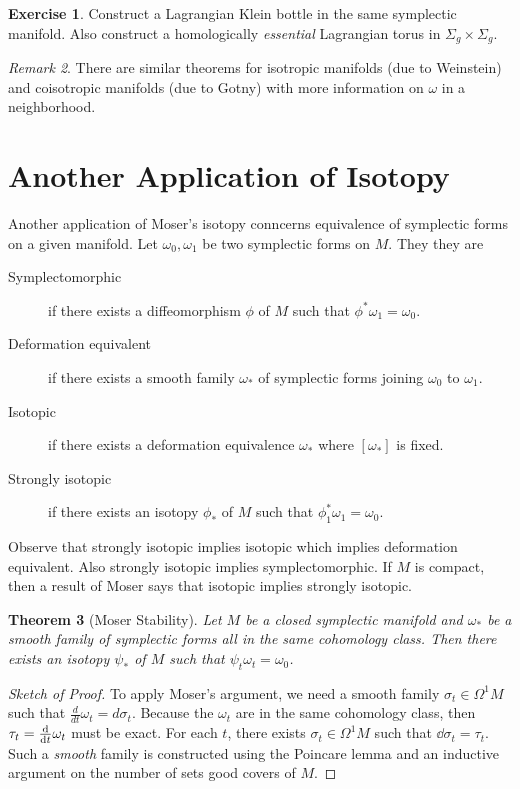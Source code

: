 \documentclass[leqno, openany]{memoir}
\newtheorem{thm}{Theorem}[chapter]
\theoremstyle{definition}
\newtheorem{exer}[thm]{Exercise}
\theoremstyle{remark}
\newtheorem{rmk}[thm]{Remark}
\theoremstyle{plain}
\theoremstyle{definition}
\theoremstyle{remark}
\begin{document}
    \begin{exer}
        Construct a Lagrangian Klein bottle in the same symplectic manifold. Also construct a homologically \textit{essential} Lagrangian torus in $\Sigma_g \times \Sigma_g$.
    \end{exer}

    \begin{rmk}
        There are similar theorems for isotropic manifolds (due to Weinstein) and coisotropic manifolds (due to Gotny) with more information on $\omega$ in a neighborhood.
    \end{rmk}

    \section{Another Application of Isotopy}%
    \label{sec:another_application_of_isotopy}

    Another application of Moser's isotopy conncerns equivalence of symplectic forms on a given manifold. Let $\omega_0, \omega_1$ be two symplectic forms on $M$. They they are 
    \begin{description}
        \item[Symplectomorphic] if there exists a diffeomorphism $\phi$ of $M$ such that $\phi^* \omega_1 = \omega_0$. 
        \item[Deformation equivalent] if there exists a smooth family $\omega_*$ of symplectic forms joining $\omega_0$ to $\omega_1$.
        \item[Isotopic] if there exists a deformation equivalence $\omega_*$ where $[\omega_*]$ is fixed.
        \item[Strongly isotopic] if there exists an isotopy $\phi_*$ of $M$ such that $\phi_1^* \omega_1 = \omega_0$.
    \end{description}
    Observe that strongly isotopic implies isotopic which implies deformation equivalent. Also strongly isotopic implies symplectomorphic. If $M$ is compact, then a result of Moser says that isotopic implies strongly isotopic.

    \begin{thm}[Moser Stability]
        Let $M$ be a closed symplectic manifold and $\omega_*$ be a smooth family of symplectic forms all in the same cohomology class. Then there exists an isotopy $\psi_*$ of $M$ such that $\psi_t \omega_t = \omega_0$.
    \end{thm}

    \begin{proof}[Sketch of Proof]
        To apply Moser's argument, we need a smooth family $\sigma_t \in \Omega^1 M$ such that $\frac{d}{dt} \omega_t = d \sigma_t$. Because the $\omega_t$ are in the same cohomology class, then $\tau_t = \dv{t} \omega_t$ must be exact. For each $t$, there exists $\sigma_t \in \Omega^1 M$ such that $\dd{\sigma_t} = \tau_t$. Such a \textit{smooth} family is constructed using the Poincare lemma and an inductive argument on the number of sets good covers of $M$.
    \end{proof}
\end{document}
